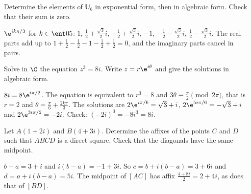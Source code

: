 \begin{exercise}
Determine the elements of $\mathbb U_6$ in exponential form, then in algebraic form. Check that their sum is zero.
\end{exercise}
\begin{solution}
$\e^{ik\pi/3}$ for $k\in\ent05$: $1$, $\frac12+\frac{\sqrt3}2i$, $-\frac12+\frac{\sqrt3}2i$, $-1$, $-\frac12-\frac{\sqrt3}2i$, $\frac12-\frac{\sqrt3}2i$. The real parts add up to $1+\frac12-\frac12-1-\frac12+\frac12=0$, and the imaginary parts cancel in pairs.
\end{solution}

\begin{exercise}
Solve in $\C$ the equation $z^3=8i$. Write $z=r\e^{i\theta}$ and give the solutions in algebraic form.
\end{exercise}
\begin{solution}
$8i=8\e^{i\pi/2}$. The equation is equivalent to $r^3=8$ and $3\theta\equiv\frac\pi2\pmod{2\pi}$, that is $r=2$ and $\theta=\frac\pi6+\frac{2k\pi}3$. The solutions are $2\e^{i\pi/6}=\sqrt3+i$, $2\e^{5i\pi/6}=-\sqrt3+i$ and $2\e^{3i\pi/2}=-2i$. Check: $(-2i)^3=-8i^3=8i$.
\end{solution}

\begin{exercise}
Let $A(1+2i)$ and $B(4+3i)$. Determine the affixes of the points $C$ and $D$ such that $ABCD$ is a direct square. Check that the diagonals have the same midpoint.
\end{exercise}
\begin{solution}
$b-a=3+i$ and $i(b-a)=-1+3i$. So $c=b+i(b-a)=3+6i$ and $d=a+i(b-a)=5i$. The midpoint of $[AC]$ has affix $\frac{4+8i}2=2+4i$, as does that of $[BD]$.
\end{solution}

